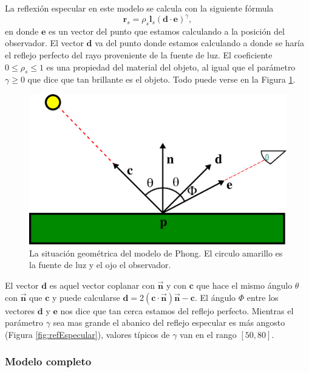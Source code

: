 La reflexión especular en este modelo se calcula con la siguiente fórmula
\begin{equation}
\textbf{r}_s = \rho_s \textbf{l}_s (\textbf{d} \cdot \textbf{e})^\gamma, 
\label{ec:refEspecular}
\end{equation}
en donde $\textbf{e}$ es un vector del punto que estamos calculando a la posición del observador. El vector $\textbf{d}$ va del punto donde estamos calculando a donde se haría el reflejo perfecto del rayo proveniente de la fuente de luz. El coeficiente $0 \leq \rho_s \leq 1$ es una propiedad del material del objeto, al igual que el parámetro $\gamma \geq 0$ que dice que tan brillante es el objeto. Todo puede verse en la Figura \ref{fig:phongGeo}.

\begin{figure}[htp]
 \centering
  \includegraphics[scale=1.0]{img/cap01/geometria}
  \caption[Situación geométrica del modelo de Phong]{La situación geométrica del modelo de Phong. El circulo amarillo es la fuente de luz y el ojo el observador.}
  \label{fig:phongGeo}
\end{figure}

El vector $\textbf{d}$ es aquel vector coplanar con $\vec{\textbf{n}}$ y con $\textbf{c}$ que hace el mismo ángulo $\theta$ con $\vec{\textbf{n}}$ que $\textbf{c}$ y puede calcularse $\textbf{d} = 2(\textbf{c} \cdot \vec{\textbf{n}})\vec{\textbf{n}} - \textbf{c}$. El ángulo $\Phi$ entre los vectores $\textbf{d}$ y $\textbf{e}$ nos dice que tan cerca estamos del reflejo perfecto. Mientras el parámetro $\gamma$ sea mas grande el abanico del reflejo especular es más angosto (Figura \ref{fig:refEspecular}), valores típicos de $\gamma$ van en el rango $[50, 80]$.

\subsubsection{Modelo completo}

